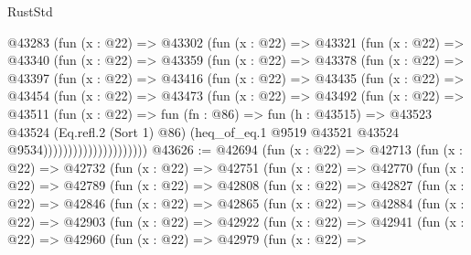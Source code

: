 \begin{lexlean}{RustStd}
\begin{coremodule}
                @43283
                  (fun (x : @22) =>
                  @43302
                    (fun (x : @22) =>
                    @43321
                      (fun (x : @22) =>
                      @43340
                        (fun (x : @22) =>
                        @43359
                          (fun (x : @22) =>
                          @43378
                            (fun (x : @22) =>
                            @43397
                              (fun (x : @22) =>
                              @43416
                                (fun (x : @22) =>
                                @43435
                                  (fun (x : @22) =>
                                  @43454
                                    (fun (x : @22) =>
                                    @43473
                                      (fun (x : @22) =>
                                      @43492
                                        (fun (x : @22) =>
                                        @43511
                                          (fun (x : @22) =>
                                          fun (fn : @86) =>
                                          fun (h : @43515) =>
                                          @43523
                                            @43524
                                            (Eq.refl.{2} (Sort 1) @86)
                                            (heq_of_eq.{1}
                                              @9519
                                              @43521
                                              @43524
                                              @9534)))))))))))))))))))))
@43626 := @42694
    (fun (x : @22) =>
    @42713
      (fun (x : @22) =>
      @42732
        (fun (x : @22) =>
        @42751
          (fun (x : @22) =>
          @42770
            (fun (x : @22) =>
            @42789
              (fun (x : @22) =>
              @42808
                (fun (x : @22) =>
                @42827
                  (fun (x : @22) =>
                  @42846
                    (fun (x : @22) =>
                    @42865
                      (fun (x : @22) =>
                      @42884
                        (fun (x : @22) =>
                        @42903
                          (fun (x : @22) =>
                          @42922
                            (fun (x : @22) =>
                            @42941
                              (fun (x : @22) =>
                              @42960
                                (fun (x : @22) =>
                                @42979
                                  (fun (x : @22) =>

\end{coremodule}
\end{lexlean}
